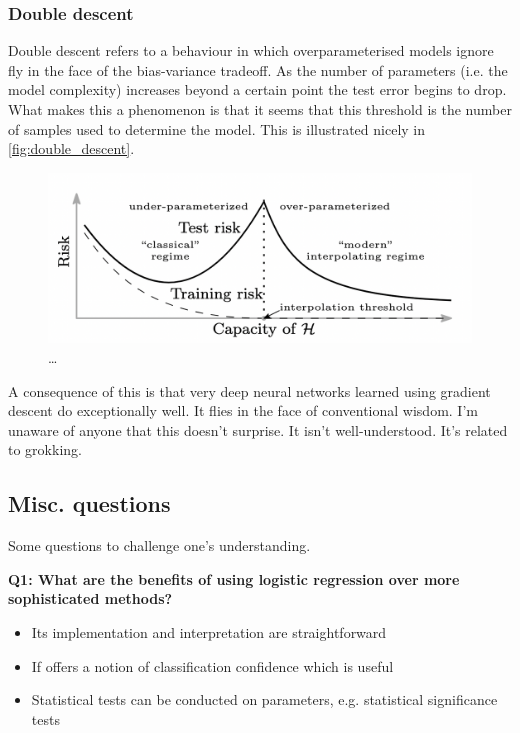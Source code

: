 \documentclass[11pt]{article}
\begin{document}
\subsubsection{Double descent}
Double descent refers to a behaviour in which overparameterised models ignore fly in the face of the bias-variance tradeoff. As the number of parameters (i.e. the model complexity) increases beyond a certain point the test error begins to drop. What makes this a phenomenon is that it seems that this threshold is the number of samples used to determine the model. This is illustrated nicely in \autoref{fig:double_descent}.

\begin{figure}[ht]
    \centering
    \includegraphics[width=\columnwidth]{./figures/supervised_learning/double_descent.png}
    \caption{\dots}
    \label{fig:double_descent}
\end{figure}

A consequence of this is that very deep neural networks learned using gradient descent do exceptionally well. It flies in the face of conventional wisdom. I'm unaware of anyone that this doesn't surprise. It isn't well-understood. It's related to grokking.

\subsection{Misc. questions}

Some questions to challenge one's understanding.

\begin{tcolorbox}[colback=c2]
\begin{center}
    \textbf{Q1: What are the benefits of using logistic regression over more sophisticated methods?}
\end{center}
\vspace{-8pt}
\begin{itemize}[label=\scriptsize\textbullet,left=0pt]
    \item Its implementation and interpretation are straightforward
    \item If offers a notion of classification confidence which is useful
    \item Statistical tests can be conducted on parameters, e.g. statistical significance tests
\end{itemize}
\end{tcolorbox}
\end{document}
